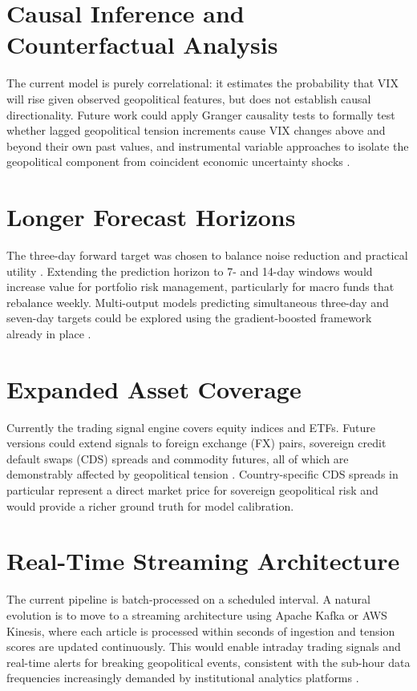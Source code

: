 \documentclass[12pt,a4paper]{report}
\begin{document}
\section{Causal Inference and Counterfactual Analysis}

The current model is purely correlational: it estimates the probability
that VIX will rise given observed geopolitical features, but does not
establish causal directionality. Future work could apply Granger causality
tests \cite{bloom2009} to formally test whether lagged geopolitical
tension increments cause VIX changes above and beyond their own past
values, and instrumental variable approaches to isolate the geopolitical
component from coincident economic uncertainty shocks \cite{baker2016}.

\section{Longer Forecast Horizons}

The three-day forward target was chosen to balance noise reduction and
practical utility \cite{mitchell1994}. Extending the prediction horizon
to 7- and 14-day windows would increase value for portfolio risk
management, particularly for macro funds that rebalance weekly.
Multi-output models predicting simultaneous three-day and seven-day
targets could be explored using the gradient-boosted framework already
in place \cite{friedman2001}.

\section{Expanded Asset Coverage}

Currently the trading signal engine covers equity indices and ETFs.
Future versions could extend signals to foreign exchange (FX) pairs,
sovereign credit default swaps (CDS) spreads and commodity futures, all
of which are demonstrably affected by geopolitical tension
\cite{caldara2022, baker2016}. Country-specific CDS spreads in particular
represent a direct market price for sovereign geopolitical risk and would
provide a richer ground truth for model calibration.

\section{Real-Time Streaming Architecture}

The current pipeline is batch-processed on a scheduled interval. A
natural evolution is to move to a streaming architecture using Apache
Kafka or AWS Kinesis, where each article is processed within seconds of
ingestion and tension scores are updated continuously. This would enable
intraday trading signals and real-time alerts for breaking geopolitical
events, consistent with the sub-hour data frequencies increasingly
demanded by institutional analytics platforms \cite{manela2017}.
\end{document}
